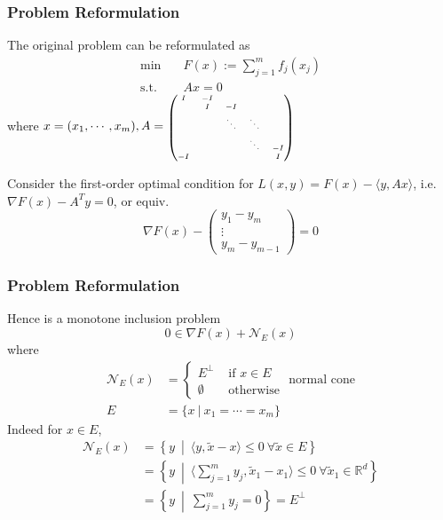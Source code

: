 
\begin{frame}
\frametitle{Problem Reformulation}

The original problem can be reformulated as
\begin{align*}
    \text{min} & \quad F(x) := \sum_{j=1}^m f_j(x_j) \\
    \text{s.t.} & \quad Ax = 0
\end{align*}
where $x = (x_1, \cdots, x_m), A = \text{{\smaller[3]$\begin{pmatrix} I & -I & & & \\ & I & -I & & \\ & & \ddots & \ddots & \\ & & & \ddots & -I \\ -I & & & & I \end{pmatrix}$}}$

Consider the first-order optimal condition for $L(x,y) = F(x) - \langle y, Ax \rangle$, i.e. $\nabla F(x) - A^Ty = 0$, or equiv.
$$\nabla F(x) - \begin{pmatrix} y_1-y_m \\ \vdots \\ y_m-y_{m-1} \end{pmatrix} = 0$$

\end{frame}


\begin{frame}
\frametitle{Problem Reformulation}

Hence is a monotone inclusion problem
$$0 \in \nabla F(x) + \mathcal{N}_E(x)$$
where
\begin{align*}
\mathcal{N}_E(x) & = \begin{cases} E^{\perp} & \text{ if } x \in E \\ \emptyset & \text{ otherwise } \end{cases} \text{normal cone} \\
E & = \{x \ |\ x_1 = \cdots = x_m\}
\end{align*}
Indeed for $x\in E$,
\begin{align*}
\mathcal{N}_E(x) & = \left\{ y \ \middle|\ \langle y, \widetilde{x} - x \rangle \leqslant 0 \ \forall \widetilde{x} \in E \right\} \\
& = \left\{ y \ \middle|\ \langle \sum\nolimits_{j=1}^m y_j, \widetilde{x}_1 - x_1 \rangle \leqslant 0 \ \forall \widetilde{x}_1 \in \mathbb{R}^d \right\} \\
& = \left\{ y \ \middle|\ \sum\nolimits_{j=1}^m y_j = 0 \right\} = E^{\perp}
\end{align*}

\end{frame}

